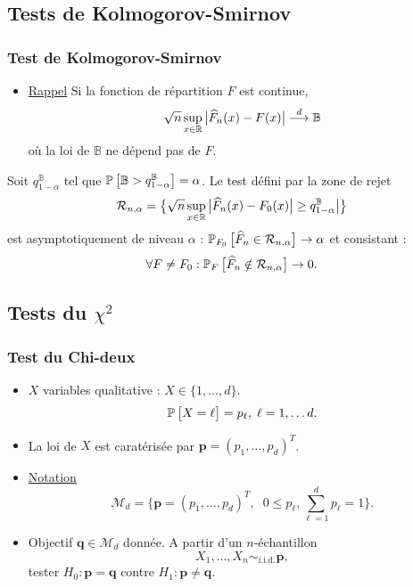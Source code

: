 \subsection{Tests de Kolmogorov-Smirnov}

\begin{frame}
\frametitle{Test de Kolmogorov-Smirnov}
\begin{itemize}
\item \underline{Rappel} Si la fonction de répartition $F$ est continue,
$$\sqrt{n}\sup_{x\in \operatorname{{\mathbb R}}}\big|\widehat F_n(x)-F(x)\big| \stackrel{d}{\longrightarrow} \mathbb{B}$$
où la loi de $\mathbb{B}$ ne dépend pas de $F$.
\end{itemize}
\begin{prop}
Soit $q_{1-\alpha}^{\mathbb{B}}$ tel que $\operatorname{{\mathbb P}}\big[\mathbb{B}>q_{1-\alpha}^{\mathbb{B}}\big]=\alpha$. Le test défini par la zone de rejet
$${\mathcal R}_{n,\alpha} = \big\{\sqrt{n}\sup_{x\in \operatorname{{\mathbb R}}}\big|\widehat F_n(x)-F_0(x)\big| \geq q_{1-\alpha}^{\mathbb{B}}\big|\big\}$$
est \alert{asymptotiquement de niveau $\alpha$ :}
$\operatorname{{\mathbb P}}_{F_0}\big[\widehat F_n \in {\mathcal R}_{n,\alpha}\big]\rightarrow \alpha$
et \alert{consistant} :
$$\forall F \neq F_0: \operatorname{{\mathbb P}}_{F}\big[\widehat F_n \notin {\mathcal R}_{n,\alpha}\big] \rightarrow 0.$$
\end{prop}
\end{frame}

\subsection{Tests du $\chi^2$}

\begin{frame}
\frametitle{Test du Chi-deux}
\begin{itemize}
\item $X$ variables \alert{qualitative} : $X \in \{1,\ldots, d\}$.
$$\operatorname{{\mathbb P}}\big[X=\ell\big]=p_\ell,\;\ell=1,\ldots d.$$
\item La loi de $X$ est caratérisée par ${\boldsymbol p} = (p_1,\ldots, p_d)^T$.
\item \underline{Notation}
$${\mathcal M}_d  = \big\{{\boldsymbol p}=(p_1,\ldots, p_d)^T,\;\;0 \leq p_\ell,\sum_{\ell=1}^dp_\ell=1\big\}.$$
\item \alert{Objectif} ${\boldsymbol q}\in {\mathcal M}_d$ donnée. A partir d'un $n$-échantillon
$$X_1,\ldots, X_n \sim_{\text{i.i.d.}}{\boldsymbol p},$$
tester
$H_0:{\boldsymbol p}={\boldsymbol q}$ \alert{contre} $H_1:{\boldsymbol p}\neq{\boldsymbol q}.$
\end{itemize}
\end{frame}




